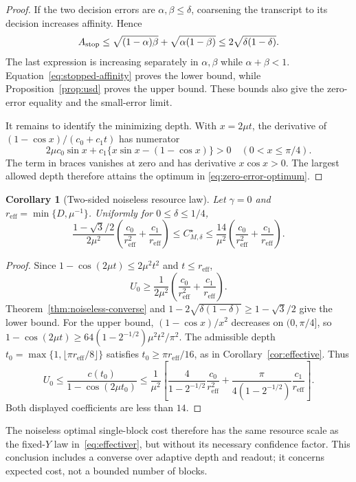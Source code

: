 \documentclass[11pt,a4paper]{article}
\newcommand{\reff}{r_{\mathrm{eff}}}
\newtheorem{corollary}[theorem]{Corollary}
\theoremstyle{definition}
\theoremstyle{remark}
\numberwithin{equation}{section}
\begin{document}
\begin{proof}
If the two decision errors are $\alpha,\beta\leq\delta$, coarsening
the transcript to its decision increases affinity. Hence
\[
 A_{\rm stop}\leq\sqrt{(1-\alpha)\beta}
                +\sqrt{\alpha(1-\beta)}
 \leq2\sqrt{\delta(1-\delta)}.
\]
The last expression is increasing separately in $\alpha,\beta$ while
$\alpha+\beta<1$. Equation~\eqref{eq:stopped-affinity} proves the
lower bound, while Proposition~\ref{prop:usd} proves the upper bound.
These bounds also give the zero-error equality and the small-error limit.

It remains to identify the minimizing depth. With $x=2\mu t$, the
derivative of $(1-\cos x)/(c_0+c_1t)$ has numerator
\[
 2\mu c_0\sin x+c_1\{x\sin x-(1-\cos x)\}>0
 \quad(0<x\leq\pi/4).
\]
The term in braces vanishes at zero and has derivative $x\cos x>0$.
The largest allowed depth therefore attains the optimum in
\eqref{eq:zero-error-optimum}.
\end{proof}

\begin{corollary}[Two-sided noiseless resource law]\label{cor:noiseless-law}
Let $\gamma=0$ and $\reff=\min\{D,\mu^{-1}\}$. Uniformly for
$0\leq\delta\leq1/4$,
\begin{equation}\label{eq:noiseless-law}
 \frac{1-\sqrt3/2}{2\mu^2}
 \left(\frac{c_0}{\reff^2}+\frac{c_1}{\reff}\right)
 \leq C^\star_{M,\delta}
 \leq\frac{14}{\mu^2}
 \left(\frac{c_0}{\reff^2}+\frac{c_1}{\reff}\right).
\end{equation}
\end{corollary}
\begin{proof}
Since $1-\cos(2\mu t)\leq2\mu^2t^2$ and $t\leq\reff$,
\[
 U_0\geq\frac1{2\mu^2}
     \left(\frac{c_0}{\reff^2}+\frac{c_1}{\reff}\right).
\]
Theorem~\ref{thm:noiseless-converse} and
$1-2\sqrt{\delta(1-\delta)}\geq1-\sqrt3/2$ give the lower bound.
For the upper bound, $(1-\cos x)/x^2$ decreases on $(0,\pi/4]$, so
$1-\cos(2\mu t)\geq64(1-2^{-1/2})\mu^2t^2/\pi^2$.
The admissible depth
$t_0=\max\{1,\lfloor\pi\reff/8\rfloor\}$ satisfies
$t_0\geq\pi\reff/16$, as in Corollary~\ref{cor:effective}. Thus
\[
 U_0\leq\frac{c(t_0)}{1-\cos(2\mu t_0)}
 \leq\frac1{\mu^2}\left[
 \frac4{1-2^{-1/2}}\frac{c_0}{\reff^2}
 +\frac{\pi}{4(1-2^{-1/2})}\frac{c_1}{\reff}\right].
\]
Both displayed coefficients are less than $14$.
\end{proof}

The noiseless optimal single-block cost therefore has the same resource
scale as the fixed-$Y$ law in~\eqref{eq:effectiver}, but without its
necessary confidence factor. This conclusion includes a converse over
adaptive depth and readout; it concerns expected cost, not a bounded
number of blocks.
\end{document}
